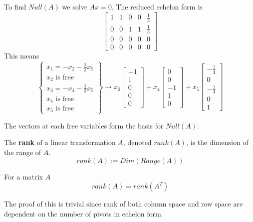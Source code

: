 To find $Null(A)$ we solve $Ax = 0$. The reduced echelon form is 
$$\begin{bmatrix}
1 & 1 & 0 & 0 & \frac{1}{3} \\
0 & 0 & 1 & 1 & \frac{1}{3} \\
0 & 0 & 0 & 0 & 0 \\
0 & 0 & 0 & 0 & 0
\end{bmatrix}$$
This means 
$$ \left\{ \begin{matrix}
x_{1} = -x_{2} - \frac{1}{3} x_{5} \\
x_{2} \text{ is free} \\
x_{3} = -x_{4} - \frac{1}{3} x_{5} \\
x_{4} \text{ is free} \\
x_{5} \text{ is free}
\end{matrix} \right\} \longrightarrow x_{2} \begin{bmatrix}
-1 \\
1 \\ 
0 \\
0 \\
0
\end{bmatrix} + x_{4} \begin{bmatrix}
0 \\ 
0 \\
-1 \\
1 \\
0
\end{bmatrix} + x_{5} \begin{bmatrix}
-\frac{1}{3} \\
0 \\
-\frac{1}{3} \\
0 \\
1
\end{bmatrix}$$

The vectors at each free variables form the basis for $Null(A)$. 

\begin{definition}
The \textbf{rank} of a linear transformation $A$, denoted $rank(A)$, is the dimension of the range of $A$. 
$$rank(A) := Dim(Range(A))$$
\end{definition}

\begin{theorem}
For a matrix $A$ 
$$rank(A) = rank(A^{T})$$

The proof of this is trivial since rank of both column space and row space are dependent on the number of pivots in echelon form. 
\end{theorem}


